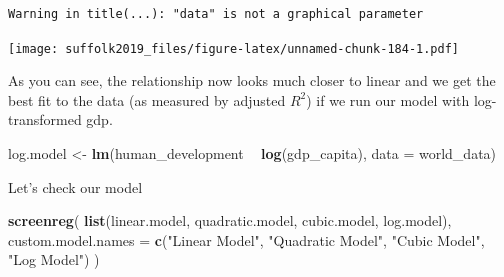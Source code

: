 \documentclass[]{article}
\newenvironment{Shaded}{\begin{snugshade}}{\end{snugshade}}
\newcommand{\DataTypeTok}[1]{\textcolor[rgb]{0.13,0.29,0.53}{#1}}
\newcommand{\KeywordTok}[1]{\textcolor[rgb]{0.13,0.29,0.53}{\textbf{#1}}}
\newcommand{\NormalTok}[1]{#1}
\newcommand{\OperatorTok}[1]{\textcolor[rgb]{0.81,0.36,0.00}{\textbf{#1}}}
\newcommand{\StringTok}[1]{\textcolor[rgb]{0.31,0.60,0.02}{#1}}
\begin{document}
\begin{verbatim}
Warning in title(...): "data" is not a graphical parameter
\end{verbatim}

\texttt{[image: suffolk2019\_files/figure-latex/unnamed-chunk-184-1.pdf]}

As you can see, the relationship now looks much closer to linear and we get the best fit to the data (as measured by adjusted \(R^2\)) if we run our model with log-transformed gdp.

\begin{Shaded}
\begin{Highlighting}[]
\NormalTok{log.model <-}\StringTok{ }\KeywordTok{lm}\NormalTok{(human_development }\OperatorTok{~}\StringTok{ }\KeywordTok{log}\NormalTok{(gdp_capita), }\DataTypeTok{data =}\NormalTok{ world_data)}
\end{Highlighting}
\end{Shaded}

Let's check our model

\begin{Shaded}
\begin{Highlighting}[]
\KeywordTok{screenreg}\NormalTok{(}
  \KeywordTok{list}\NormalTok{(linear.model, quadratic.model, cubic.model, log.model),}
  \DataTypeTok{custom.model.names =} \KeywordTok{c}\NormalTok{(}\StringTok{"Linear Model"}\NormalTok{, }\StringTok{"Quadratic Model"}\NormalTok{, }\StringTok{"Cubic Model"}\NormalTok{, }\StringTok{"Log Model"}\NormalTok{)}
\NormalTok{)}
\end{Highlighting}
\end{Shaded}
\end{document}
